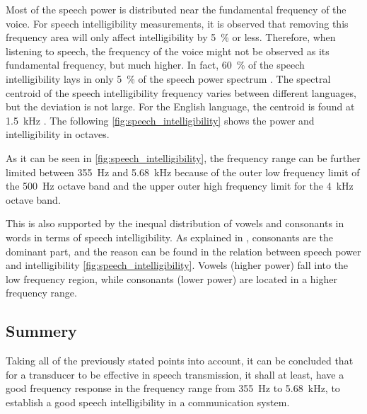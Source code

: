 Most of the speech power is distributed near the fundamental frequency of the voice. For speech intelligibility measurements, it is observed that removing this frequency area will only affect intelligibility by \SI{5}{\percent} or less. Therefore, when listening to speech, the frequency of the voice might not be observed as its fundamental frequency, but much higher. In fact, \SI{60}{\percent} of the speech intelligibility lays in only \SI{5}{\percent} of the speech power spectrum \citep{arl_us_army}. The spectral centroid of the speech intelligibility frequency varies between different languages, but the deviation is not large. For the English language, the centroid is found at \SI{1.5}{\kilo\hertz} \citep{arl_us_army}. The following \autoref{fig:speech_intelligibility} shows the power and intelligibility in octaves. 



As it can be seen in \autoref{fig:speech_intelligibility}, the frequency range can be further limited between \SI{355}{\hertz} and \SI{5.68}{\kilo\hertz} because of the outer low frequency limit of the \SI{500}{\hertz} octave band and the upper outer high frequency limit for the \SI{4}{\kilo\hertz} octave band. 

This is also supported by the inequal distribution of vowels and consonants in words in terms of speech intelligibility. As explained in \citep{arl_us_army}, consonants are the dominant part, and the reason can be found in the relation between speech power and intelligibility \autoref{fig:speech_intelligibility}. Vowels (higher power) fall into the low frequency region, while consonants (lower power) are located in a higher frequency range.

\subsection{Summery}
Taking all of the previously stated points into account, it can be concluded that for a transducer to be effective in speech transmission, it shall at least, have a good frequency response in the frequency range from \SI{355}{\hertz} to \SI{5.68}{\kilo\hertz}, to establish a good speech intelligibility in a communication system.

